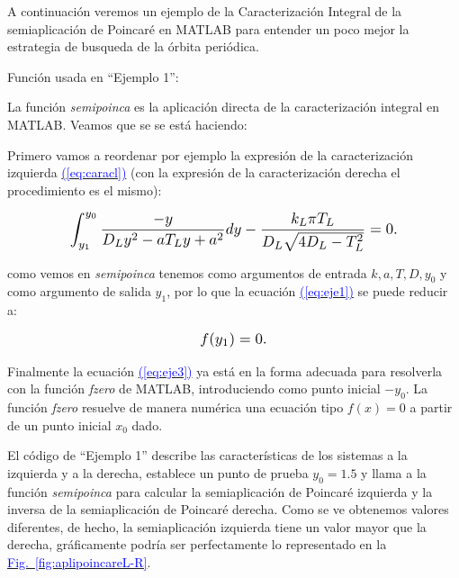 \documentclass[12pt,a4paper]{report} %
\newcommand{\fref}[1]{\hyperref[#1]{\textcolor{blue}{Fig.~\ref*{#1}}}}
\newcommand{\eref}[1]{\hyperref[#1]{\textcolor{blue}{(\ref*{#1})}}}
\begin{document}
	\vspace{0.5cm} A continuación veremos un ejemplo de la Caracterización Integral de la semiaplicación de Poincaré en MATLAB para entender un poco mejor la estrategia de busqueda de la órbita periódica.
	
	\vspace{1cm}
	
	\vspace{1cm}
	
	\vspace{1cm}\noindent Función usada en ``Ejemplo 1'':
	\vspace{0.5cm}
	
	\newpage
	
	La función \textit{semipoinca} es la aplicación directa de la caracterización integral en MATLAB. Veamos que se se está haciendo:
	
	\vspace{0.5cm}\noindent Primero vamos a reordenar por ejemplo la expresión de la caracterización izquierda \eref{eq:caracl} (con la expresión de la caracterización derecha el procedimiento es el mismo):
	
	\begin{equation}
			\label{eq:eje1}
		\scalebox{1.2}{$\displaystyle
		\begin{gathered}
			\int_{y_1}^{y_0}\frac{-y}{D_Ly^2-aT_Ly+a^2}dy-\frac{k_L\pi T_L}{D_L\sqrt{4D_L-T_L^2}}=0.
		\end{gathered}
			$}
	\end{equation}\smallskip
	
	\noindent como vemos en \textit{semipoinca} tenemos como argumentos de entrada $k,a,T,D,y_0$ y como argumento de salida $y_1$, por lo que la ecuación \eref{eq:eje1} se puede reducir a:
	
		\begin{equation}
		\label{eq:eje3}
		\scalebox{1.2}{$\displaystyle
				f(y_1)=0.
			$}
	\end{equation}\smallskip
	
	\noindent Finalmente la ecuación \eref{eq:eje3} ya está en la forma adecuada para resolverla con la función \textit{fzero} de MATLAB, introduciendo como punto inicial $-y_0$. La función \textit{fzero} resuelve de manera numérica una ecuación tipo $f(x)=0$ a partir de un punto inicial $x_0$ dado.
	
	\vspace{0.5cm}\noindent El código de ``Ejemplo 1'' describe las características de los sistemas a la izquierda y a la derecha, establece un punto de prueba $y_0=1.5$ y llama a la función \textit{semipoinca} para calcular la semiaplicación de Poincaré izquierda y la inversa de la semiaplicación de Poincaré derecha. Como se ve obtenemos valores diferentes, de hecho, la semiaplicación izquierda tiene un valor mayor que la derecha, gráficamente podría ser perfectamente lo representado en la \fref{fig:aplipoincareL-R}.
	\newpage
	
\end{document}
